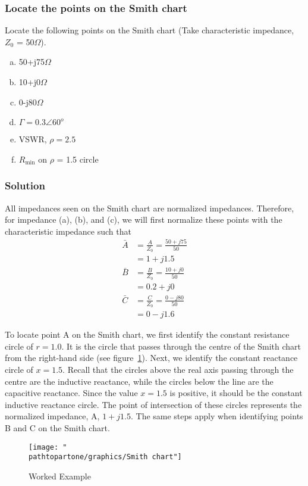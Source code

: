 \begin{exmp}\label{exmp:locatepoints}
\subsubsection*{Locate the points on the Smith chart}
Locate the following points on the Smith chart (Take characteristic impedance, $Z_{0}$ = 50$\Omega$).

\begin{enumerate}[(a)]
\item 50+j75$\varOmega$
\item 10+j0$\varOmega$
\item 0-j80$\varOmega$
\item $\Gamma=0.3\angle60^o$
\item VSWR, $\rho=2.5$
\item $R_\min$ on $\rho$ = 1.5 circle
\end{enumerate}

\subsubsection*{Solution}
All impedances seen on the Smith chart are normalized impedances. Therefore, for impedance (a), (b), and (c), we will first normalize these points with the characteristic impedance such that
\begin{align*}
\bar{A}&=\frac{A}{Z_{0}}
=\frac{50 + j75}{50}\\
&=1+j1.5\\
\bar{B}&=\frac{B}{Z_{0}}
= \frac{10 + j0}{50}\\
&=0.2+j0\\
\bar{C}&=\frac{C}{Z_{0}}
= \frac{0 - j80}{50}\\
&=0-j1.6
\end{align*}

To locate point A on the Smith chart, we first identify the constant resistance circle of $r = 1.0$. It is the circle that passes through the centre of the Smith chart from the right-hand side (see figure~\ref{fig:workedexample1}). Next, we identify the constant reactance circle of $x = 1.5$. Recall that the circles above the real axis passing through the centre are the inductive reactance, while the circles below the line are the capacitive reactance. Since the value $x = 1.5$ is positive, it should be the constant inductive reactance circle. The point of intersection of these circles represents the normalized impedance, A, $1 + j1.5$. The same steps apply when identifying points B and C on the Smith chart.
\begin{figure}[h]
\centering
\texttt{[image: "\\pathtopartone/graphics/Smith chart"]}
\caption{Worked Example}
\label{fig:workedexample1}
\end{figure}


\end{exmp}
